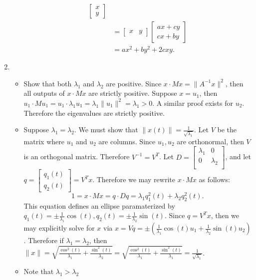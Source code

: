 \documentclass[12pt, letterpaper]{article}
\begin{document}
\begin{enumerate}
\begin{itemize}
\begin{align*}
\begin{bmatrix}
				x \\ y
				\end{bmatrix}\\
				&= \begin{bmatrix}
				x & y
				\end{bmatrix}\begin{bmatrix}
			ax + cy \\ cx + by
\end{bmatrix}\\
	&= ax^2 + by^2 + 2cxy.
			\end{align*}
		\end{itemize}
		\item 
		\begin{itemize}
			\item Show that both $\lambda_1$ and $\lambda_2$ are positive.  Since $x \cdot M x = \|A^{-1}x\|^2$, then all outputs of $x \cdot M x$ are strictly positive.  Suppose $x = u_1$, then $u_1 \cdot M u_1 = u_1 \cdot \lambda_1 u_1 = \lambda_1 \|u_1\|^2 = \lambda_1 > 0$.  A similar proof exists for $u_2$.  Therefore the eigenvalues are strictly positive.   
			\item Suppose $\lambda_1 = \lambda_2$.  We must show that $\| x(t) \| = \frac{1}{\sqrt{\lambda_1}}$.  Let $V$ be the matrix where $u_1$ and $u_2$ are columns.  Since $u_1, u_2$ are orthonormal, then $V$ is an orthogonal matrix.  Therefore $V^{-1} = V^T$.  Let $D = \begin{bmatrix}
			\lambda_1 & 0\\
			0 & \lambda_2\\
\end{bmatrix}			 $, and let $q = \begin{bmatrix}
q_1(t)\\q_2(t)
\end{bmatrix} = V^T x$.  Therefore we may rewrite $x \cdot M x$ as follows: 
			$$
				1 = x \cdot M x = q \cdot D q = \lambda_1 q_1^2(t) + \lambda_2 q_2^2(t).  			
			$$
			This equation defines an ellipse paramaterized by $q_1(t) = \pm \frac{1}{\lambda_1}\cos(t), q_2(t) = \pm \frac{1}{\lambda_2}\sin(t)$.  Since $q = V^T x$, then we may explicitly solve for $x$ via $x = Vq = \pm (\frac{1}{\lambda_1}\cos(t)u_1 + \frac{1}{\lambda_2}\sin(t)u_2)$.  Therefore if $\lambda_1 = \lambda_2$, then $\|x\| = \sqrt{\frac{\cos^2(t)}{\lambda_1} + \frac{\sin^2(t)}{\lambda_2} } = \sqrt{\frac{\cos^2(t)}{\lambda_1} + \frac{\sin^2(t)}{\lambda_1} } = \frac{1}{\sqrt{\lambda_1}}$.
			\item Note that $\lambda_1 > \lambda_2$
			\begin{itemize}

\end{itemize}
\end{itemize}
\end{enumerate}
\end{document}
